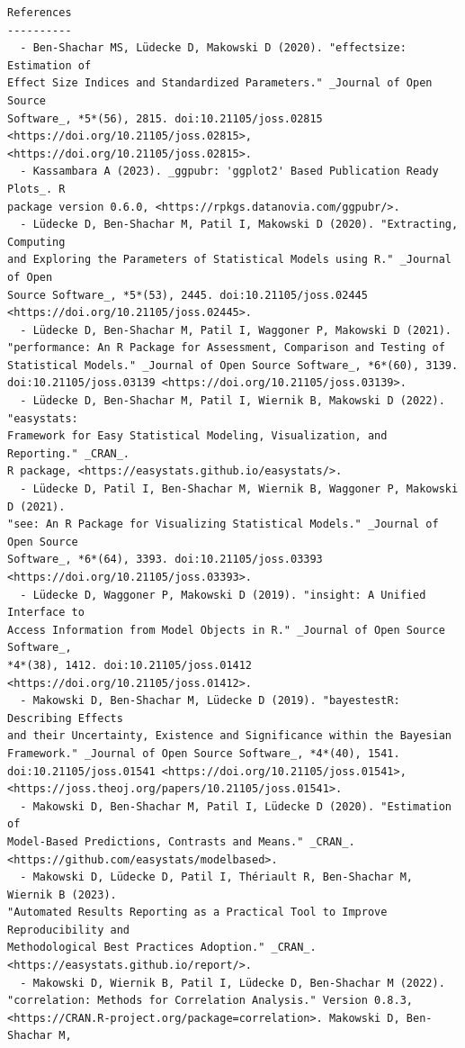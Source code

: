 \documentclass[
  10pt]{article}
\begin{document}
\begin{tcolorbox}[enhanced jigsaw, leftrule=.75mm, colframe=quarto-callout-color-frame, breakable, opacityback=0, bottomrule=.15mm, left=2mm, rightrule=.15mm, arc=.35mm, toprule=.15mm, colback=white]
\begin{verbatim}
References
----------
  - Ben-Shachar MS, Lüdecke D, Makowski D (2020). "effectsize: Estimation of
Effect Size Indices and Standardized Parameters." _Journal of Open Source
Software_, *5*(56), 2815. doi:10.21105/joss.02815
<https://doi.org/10.21105/joss.02815>, <https://doi.org/10.21105/joss.02815>.
  - Kassambara A (2023). _ggpubr: 'ggplot2' Based Publication Ready Plots_. R
package version 0.6.0, <https://rpkgs.datanovia.com/ggpubr/>.
  - Lüdecke D, Ben-Shachar M, Patil I, Makowski D (2020). "Extracting, Computing
and Exploring the Parameters of Statistical Models using R." _Journal of Open
Source Software_, *5*(53), 2445. doi:10.21105/joss.02445
<https://doi.org/10.21105/joss.02445>.
  - Lüdecke D, Ben-Shachar M, Patil I, Waggoner P, Makowski D (2021).
"performance: An R Package for Assessment, Comparison and Testing of
Statistical Models." _Journal of Open Source Software_, *6*(60), 3139.
doi:10.21105/joss.03139 <https://doi.org/10.21105/joss.03139>.
  - Lüdecke D, Ben-Shachar M, Patil I, Wiernik B, Makowski D (2022). "easystats:
Framework for Easy Statistical Modeling, Visualization, and Reporting." _CRAN_.
R package, <https://easystats.github.io/easystats/>.
  - Lüdecke D, Patil I, Ben-Shachar M, Wiernik B, Waggoner P, Makowski D (2021).
"see: An R Package for Visualizing Statistical Models." _Journal of Open Source
Software_, *6*(64), 3393. doi:10.21105/joss.03393
<https://doi.org/10.21105/joss.03393>.
  - Lüdecke D, Waggoner P, Makowski D (2019). "insight: A Unified Interface to
Access Information from Model Objects in R." _Journal of Open Source Software_,
*4*(38), 1412. doi:10.21105/joss.01412 <https://doi.org/10.21105/joss.01412>.
  - Makowski D, Ben-Shachar M, Lüdecke D (2019). "bayestestR: Describing Effects
and their Uncertainty, Existence and Significance within the Bayesian
Framework." _Journal of Open Source Software_, *4*(40), 1541.
doi:10.21105/joss.01541 <https://doi.org/10.21105/joss.01541>,
<https://joss.theoj.org/papers/10.21105/joss.01541>.
  - Makowski D, Ben-Shachar M, Patil I, Lüdecke D (2020). "Estimation of
Model-Based Predictions, Contrasts and Means." _CRAN_.
<https://github.com/easystats/modelbased>.
  - Makowski D, Lüdecke D, Patil I, Thériault R, Ben-Shachar M, Wiernik B (2023).
"Automated Results Reporting as a Practical Tool to Improve Reproducibility and
Methodological Best Practices Adoption." _CRAN_.
<https://easystats.github.io/report/>.
  - Makowski D, Wiernik B, Patil I, Lüdecke D, Ben-Shachar M (2022).
"correlation: Methods for Correlation Analysis." Version 0.8.3,
<https://CRAN.R-project.org/package=correlation>. Makowski D, Ben-Shachar M,

\end{verbatim}
\end{tcolorbox}
\end{document}

